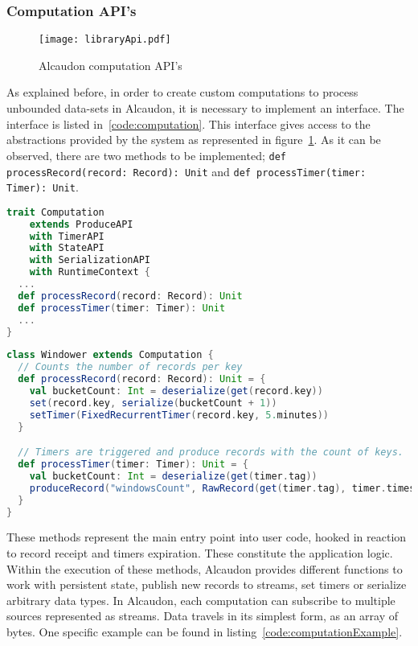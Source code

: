 \subsubsection{Computation API's}

\begin{figure}[!h]
  \begin{center}
  \texttt{[image: libraryApi.pdf]}
  \caption{Alcaudon computation API's}
  \label{fig:apis}
  \end{center}
\end{figure}

As explained before, in order to create custom computations to process unbounded
data-sets in Alcaudon, it is necessary to implement an interface. The interface
is listed in~\ref{code:computation}. This interface gives access to the
abstractions provided by the system as represented in figure~\ref{fig:apis}. As
it can be observed, there are two methods to be implemented;
\lstinline[columns=fixed]{def processRecord(record: Record): Unit} and \lstinline[columns=fixed]{def processTimer(timer: Timer): Unit}.

\begin{lstlisting}[language=scala, frame=trBL, label=code:computation, float=ht, caption = {Computation API's}]
trait Computation
    extends ProduceAPI
    with TimerAPI
    with StateAPI
    with SerializationAPI
    with RuntimeContext {
  ...
  def processRecord(record: Record): Unit
  def processTimer(timer: Timer): Unit
  ...
}
\end{lstlisting}

\begin{lstlisting}[language=scala, frame=trBL, label=code:computationExample, float=ht, caption = {Computation example}]
class Windower extends Computation {
  // Counts the number of records per key
  def processRecord(record: Record): Unit = {
    val bucketCount: Int = deserialize(get(record.key))
    set(record.key, serialize(bucketCount + 1))
    setTimer(FixedRecurrentTimer(record.key, 5.minutes))
  }

  // Timers are triggered and produce records with the count of keys.
  def processTimer(timer: Timer): Unit = {
    val bucketCount: Int = deserialize(get(timer.tag))
    produceRecord("windowsCount", RawRecord(get(timer.tag), timer.timestamp))
  }
}
\end{lstlisting}

These methods represent the main entry point into user code, hooked in reaction to
record receipt and timers expiration. These constitute the application logic.
Within the execution of these methods, Alcaudon provides different functions to
work with persistent state, publish new records to streams, set timers or
serialize arbitrary data types. In Alcaudon, each computation can subscribe to
multiple sources represented as streams. Data travels in its simplest form,
as an array of bytes. One specific example can be found in listing~\ref{code:computationExample}.

